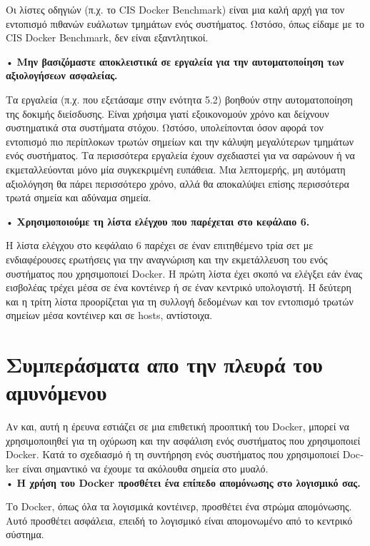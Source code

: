 Οι λίστες οδηγιών (π.χ. το \textlatin{CIS Docker Benchmark}) είναι μια καλή αρχή
για τον εντοπισμό πιθανών ευάλωτων τμημάτων ενός συστήματος. Ωστόσο, όπως
είδαμε με το \textlatin{CIS Docker Benchmark}, δεν είναι εξαντλητικοί.

• \textbf{Μην βασιζόμαστε αποκλειστικά σε εργαλεία για την αυτοματοποίηση των
αξιολογήσεων ασφαλείας.}

Τα εργαλεία (π.χ. που εξετάσαμε στην ενότητα 5.2) βοηθούν στην αυτοματοποίηση
της δοκιμής διείσδυσης. Είναι χρήσιμα γιατί εξοικονομούν χρόνο και δείχνουν
συστηματικά στα συστήματα στόχου. Ωστόσο, υπολείπονται όσον αφορά τον εντοπισμό
πιο περίπλοκων τρωτών σημείων και την κάλυψη μεγαλύτερων τμημάτων ενός
συστήματος. Τα περισσότερα εργαλεία έχουν σχεδιαστεί για να σαρώνουν ή να
εκμεταλλεύονται μόνο μία συγκεκριμένη ευπάθεια. Μια λεπτομερής, μη αυτόματη
αξιολόγηση θα πάρει περισσότερο χρόνο, αλλά θα αποκαλύψει επίσης περισσότερα
τρωτά σημεία και αδύναμα σημεία.

• \textbf{Χρησιμοποιούμε τη λίστα ελέγχου που παρέχεται στο κεφάλαιο 6.}

Η λίστα ελέγχου στο κεφάλαιο 6 παρέχει σε έναν επιτηθέμενο τρία σετ με
ενδιαφέρουσες ερωτήσεις για την αναγνώριση και την εκμετάλλευση του ενός
συστήματος που χρησιμοποιεί \textlatin{Docker}. Η πρώτη λίστα έχει σκοπό να
ελέγξει εάν ένας εισβολέας τρέχει μέσα σε ένα κοντέινερ ή σε έναν κεντρικό
υπολογιστή. Η δεύτερη και η τρίτη λίστα προορίζεται για τη συλλογή δεδομένων και
τον εντοπισμό τρωτών σημείων μέσα κοντέινερ και σε \textlatin{hosts},
αντίστοιχα.


\section{Συμπεράσματα απο την πλευρά του αμυνόμενου}

Αν και, αυτή η έρευνα εστιάζει σε μια επιθετική προοπτική του
\textlatin{Docker}, μπορεί να χρησιμοποιηθεί για τη οχύρωση και την ασφάλιση
ενός συστήματος που χρησιμοποιεί \textlatin{Docker}. Κατά το σχεδιασμό ή τη
συντήρηση ενός συστήματος που χρησιμοποιεί \textlatin{Docker} είναι σημαντικό να
έχουμε τα ακόλουθα σημεία στο μυαλό. \\

• \textbf{Η χρήση του \textlatin{Docker} προσθέτει ένα επίπεδο απομόνωσης στο
λογισμικό σας.}

Το \textlatin{Docker}, όπως όλα τα λογισμικά κοντέινερ, προσθέτει ένα στρώμα
απομόνωσης. Αυτό προσθέτει ασφάλεια, επειδή το λογισμικό είναι απομονωμένο από
το κεντρικό σύστημα.

